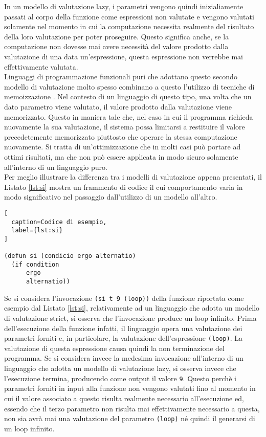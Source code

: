 In un modello di valutazione lazy, i parametri vengono quindi inizialiamente
passati al corpo della funzione come espressioni non valutate e vengono valutati
solamente nel momento in cui la computazione necessita realmente del risultato
della loro valutazione per poter proseguire. Questo significa anche, se la
computazione non dovesse mai avere necessità del valore prodotto dalla
valutazione di una data un'espressione, questa espressione non verrebbe mai
effettivamente valutata.\\

Linguaggi di programmazione funzionali puri che adottano questo secondo modello
di valutazione molto spesso combinano a questo l'utilizzo di tecniche di
memoizzazione \cite{Geyer-Schulz:1989:MEM:379209.379211}. Nel contesto di un
linguaggio di questo tipo, una volta che un dato parametro viene valutato, il
valore prodotto dalla valutazione viene memorizzato. Questo in maniera tale che,
nel caso in cui il programma richieda nuovamente la sua valutazione, il sistema
possa limitarsi a restituire il valore precedetemente memorizzato piuttosto che
operare la stessa computazione nuovamente. Si tratta di un'ottimizzazione che in
molti casi può portare ad ottimi risultati, ma che non può essere applicata in
modo sicuro solamente all'interno di un linguaggio puro.\\

Per meglio illustrare la differenza tra i modelli di valutazione appena
presentati, il Listato \ref{lst:si} mostra un frammento di codice il cui
comportamento varia in modo significativo nel passaggio dall'utilizzo di un
modello all'altro.

\begin{lstlisting}[
  caption=Codice di esempio,
  label={lst:si}
]

(defun si (condicio ergo alternatio)
  (if condition
      ergo
      alternatio))

\end{lstlisting}

Se si considera l'invocazione \texttt{(si t 9 (loop))} della funzione riportata
come esempio dal Listato \ref{lst:si}, relativamente ad un linguaggio che adotta
un modello di valutazione strict, si osserva che l'invocazione produce un loop
infinito. Prima dell'esecuzione della funzione infatti, il linguaggio opera una
valutazione dei parametri forniti e, in particolare, la valutazione
dell'espressione \texttt{(loop)}. La valutazione di questa espressione causa
quindi la non terminazione del programma. Se si considera invece la medesima
invocazione all'interno di un linguaggio che adotta un modello di valutazione
lazy, si osserva invece che l'esecuzione termina, producendo come output il
valore \texttt{9}. Questo perchè i parametri forniti in input alla funzione non
vengono valutati fino al momento in cui il valore associato a questo risulta
realmente necessario all'esecuzione ed, essendo che il terzo parametro non
risulta mai effettivamente necessario a questa, non sia avrà mai una valutazione
del parametro \texttt{(loop)} né quindi il generarsi di un loop infinito.\\

